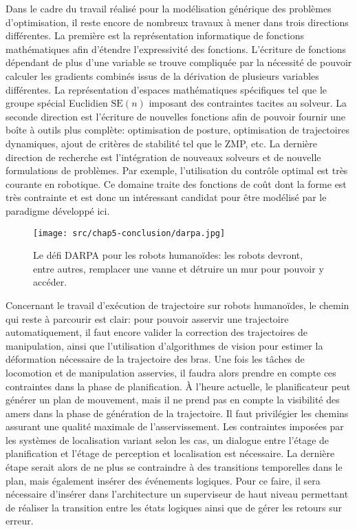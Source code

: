 Dans le cadre du travail réalisé pour la modélisation générique des
problèmes d'optimisation, il reste encore de nombreux travaux à mener
dans trois directions différentes. La première est la représentation
informatique de fonctions mathématiques afin d'étendre l'expressivité
des fonctions. L'écriture de fonctions dépendant de plus d'une
variable se trouve compliquée par la nécessité de pouvoir calculer les
gradients combinés issus de la dérivation de plusieurs variables
différentes. La représentation d'espaces mathématiques spécifiques tel
que le groupe spécial Euclidien $\text{SE}(n)$ imposant des
contraintes tacites au solveur. La seconde direction est l'écriture de
nouvelles fonctions afin de pouvoir fournir une boîte à outils plus
complète: optimisation de posture, optimisation de trajectoires
dynamiques, ajout de critères de stabilité tel que le ZMP, etc. La
dernière direction de recherche est l'intégration de nouveaux solveurs
et de nouvelle formulations de problèmes. Par exemple, l'utilisation
du contrôle optimal est très courante en robotique. Ce domaine traite
des fonctions de coût dont la forme est très contrainte et est donc un
intéressant candidat pour être modélisé par le paradigme développé
ici.


\begin{figure}[htbp]
  \begin{center}
    \texttt{[image: src/chap5-conclusion/darpa.jpg]}
  \end{center}
  \caption{Le défi DARPA pour les robots humanoïdes: les robots
    devront, entre autres, remplacer une vanne et détruire un mur pour
    pouvoir y accéder. \label{fig:darpachallenge}}
\end{figure}


Concernant le travail d'exécution de trajectoire sur robots humanoïdes,
le chemin qui reste à parcourir est clair: pour pouvoir asservir une
trajectoire automatiquement, il faut encore valider la correction des
trajectoires de manipulation, ainsi que l'utilisation d'algorithmes de
vision pour estimer la déformation nécessaire de la trajectoire des
bras. Une fois les tâches de locomotion et de manipulation asservies,
il faudra alors prendre en compte ces contraintes dans la phase de
planification. À l'heure actuelle, le planificateur peut générer un
plan de mouvement, mais il ne prend pas en compte la visibilité des
amers dans la phase de génération de la trajectoire. Il faut
privilégier les chemins assurant une qualité maximale de
l'asservissement. Les contraintes imposées par les systèmes de
localisation variant selon les cas, un dialogue entre l'étage de
planification et l'étage de perception et localisation est nécessaire.
La dernière étape serait alors de ne plus se contraindre à des
transitions temporelles dans le plan, mais également insérer des
événements logiques. Pour ce faire, il sera nécessaire d'insérer dans
l'architecture un superviseur de haut niveau permettant de réaliser la
transition entre les états logiques ainsi que de gérer les retours sur
erreur.


